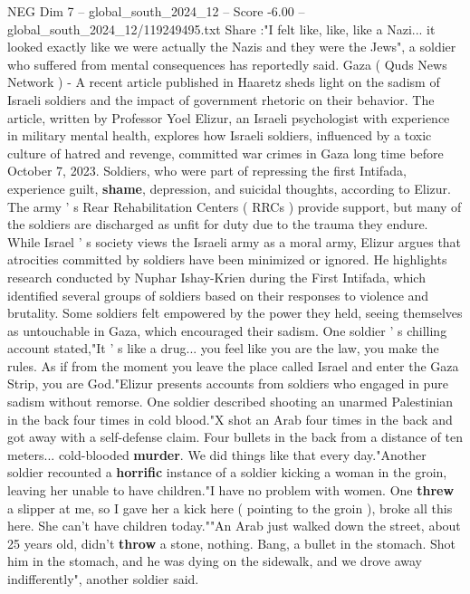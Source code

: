 \begin{textsample}{NEG Dim 7 – global\_south\_2024\_12 – Score -6.00 – global\_south\_2024\_12/119249495.txt}  \label{ex:f7_neg_292}
Share :"I felt like, like, like a Nazi... it looked exactly like we were actually the Nazis and they were the Jews", a soldier who suffered from mental consequences has reportedly said.
Gaza ( Quds News Network ) - A recent article published in Haaretz sheds light on the sadism of Israeli soldiers and the impact of government rhetoric on their behavior.
The article, written by Professor Yoel Elizur, an Israeli psychologist with experience in military mental health, explores how Israeli soldiers, influenced by a toxic culture of hatred and revenge, committed war crimes in Gaza long time before October 7, 2023.
Soldiers, who were part of repressing the first Intifada, experience guilt, \textbf{shame}, depression, and suicidal thoughts, according to Elizur.
The army ' s Rear Rehabilitation Centers ( RRCs ) provide support, but many of the soldiers are discharged as unfit for duty due to the trauma they endure.
While Israel ' s society views the Israeli army as a moral army, Elizur argues that atrocities committed by soldiers have been minimized or ignored.
He highlights research conducted by Nuphar Ishay-Krien during the First Intifada, which identified several groups of soldiers based on their responses to violence and brutality.
Some soldiers felt empowered by the power they held, seeing themselves as untouchable in Gaza, which encouraged their sadism.
One soldier ' s chilling account stated,"It ' s like a drug... you feel like you are the law, you make the rules.
As if from the moment you leave the place called Israel and enter the Gaza Strip, you are God."Elizur presents accounts from soldiers who engaged in pure sadism without remorse.
One soldier described shooting an unarmed Palestinian in the back four times in cold blood."X shot an Arab four times in the back and got away with a self-defense claim.
Four bullets in the back from a distance of ten meters... cold-blooded \textbf{murder}.
We did things like that every day."Another soldier recounted a \textbf{horrific} instance of a soldier kicking a woman in the groin, leaving her unable to have children."I have no problem with women.
One \textbf{threw} a slipper at me, so I gave her a kick here ( pointing to the groin ), broke all this here.
She can't have children today.""An Arab just walked down the street, about 25 years old, didn't \textbf{throw} a stone, nothing.
Bang, a bullet in the stomach.
Shot him in the stomach, and he was dying on the sidewalk, and we drove away indifferently", another soldier said.

\end{textsample}
